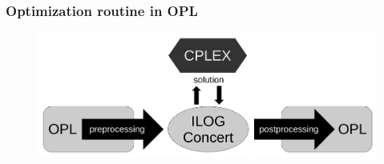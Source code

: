 \begin{frame}
 \frametitle{Optimization routine in OPL}
 \begin{figure}
   \centering
   \includegraphics[width=\linewidth]{Bilder/OPL-Ablauf}
 \end{figure}
\end{frame}

